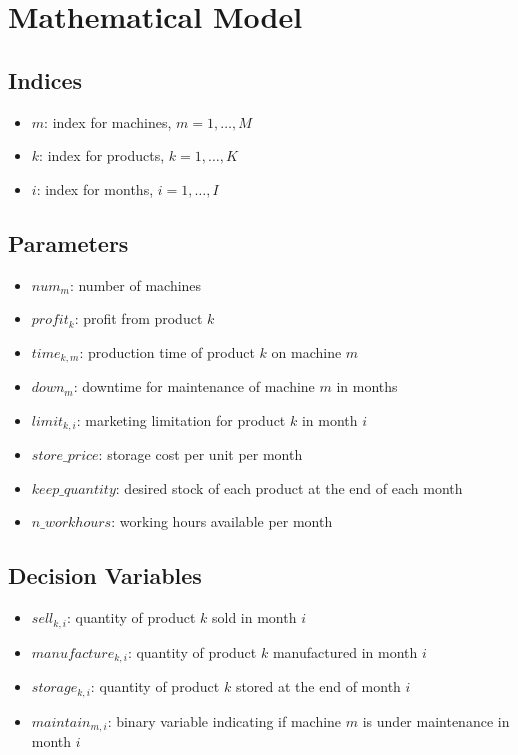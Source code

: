 \documentclass{article}
\begin{document}
\section*{Mathematical Model}

\subsection*{Indices}
\begin{itemize}
    \item $m$: index for machines, $m = 1, \ldots, M$
    \item $k$: index for products, $k = 1, \ldots, K$
    \item $i$: index for months, $i = 1, \ldots, I$
\end{itemize}

\subsection*{Parameters}
\begin{itemize}
    \item $num_{m}$: number of machines
    \item $profit_{k}$: profit from product $k$
    \item $time_{k,m}$: production time of product $k$ on machine $m$
    \item $down_{m}$: downtime for maintenance of machine $m$ in months
    \item $limit_{k,i}$: marketing limitation for product $k$ in month $i$
    \item $store\_price$: storage cost per unit per month
    \item $keep\_quantity$: desired stock of each product at the end of each month
    \item $n\_workhours$: working hours available per month
\end{itemize}

\subsection*{Decision Variables}
\begin{itemize}
    \item $sell_{k,i}$: quantity of product $k$ sold in month $i$
    \item $manufacture_{k,i}$: quantity of product $k$ manufactured in month $i$
    \item $storage_{k,i}$: quantity of product $k$ stored at the end of month $i$
    \item $maintain_{m,i}$: binary variable indicating if machine $m$ is under maintenance in month $i$
\end{itemize}
\end{document}
